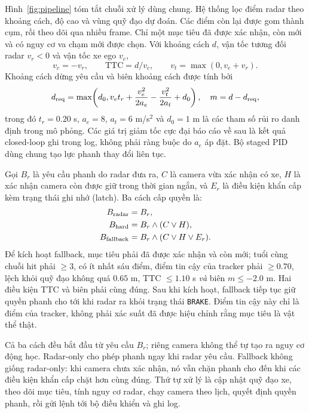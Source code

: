 \documentclass[conference]{IEEEtran}
\begin{document}
Hình~\ref{fig:pipeline} tóm tắt chuỗi xử lý dùng chung. Hệ thống lọc điểm radar theo khoảng cách, độ cao và vùng quỹ đạo dự đoán.
Các điểm còn lại được gom thành cụm, rồi theo dõi qua nhiều frame. Chỉ một
mục tiêu đã được xác nhận, còn mới và có nguy cơ va chạm mới được chọn. Với
khoảng cách $d$, vận tốc tương đối radar $v_r<0$ và vận tốc xe ego $v_e$,
\begin{equation}
v_c=-v_r,\qquad \mathrm{TTC}=d/v_c,\qquad v_t=\max(0,v_e+v_r).
\end{equation}
Khoảng cách dừng yêu cầu và biên khoảng cách được tính bởi
\begin{equation}
d_{\rm req}=\max\!\left(d_0,v_et_r+\frac{v_e^2}{2a_e}-\frac{v_t^2}{2a_t}+d_0\right),
\quad m=d-d_{\rm req},
\end{equation}
trong đó $t_r=0.20$ s, $a_e=8$, $a_t=6$ m/s$^2$ và $d_0=1$ m là các tham số
rủi ro danh định trong mô phỏng. Các giá trị giảm tốc cực đại báo cáo về sau là
kết quả closed-loop ghi trong log, không phải ràng buộc do $a_e$ áp đặt. Bộ
staged PID dùng chung tạo lực phanh thay đổi liên tục.

Gọi $B_r$ là yêu cầu phanh do radar đưa ra, $C$ là camera vừa xác nhận có xe,
$H$ là xác nhận camera còn được giữ trong thời gian ngắn, và $E_r$ là điều
kiện khẩn cấp kèm trạng thái ghi nhớ (latch). Ba cách cấp quyền là:
\begin{align}
 B_{\rm radar}&=B_r,\\
 B_{\rm hard}&=B_r\land(C\lor H),\\
 B_{\rm fallback}&=B_r\land(C\lor H\lor E_r).
\end{align}
Để kích hoạt fallback, mục tiêu phải đã được xác nhận và còn mới; tuổi cùng
chuỗi hit phải $\geq3$, có ít nhất sáu điểm, điểm tin cậy của tracker phải
$\geq0.70$, lệch khỏi quỹ đạo không quá $0.65$ m, TTC $\leq1.10$ s
\emph{và} biên $m\leq-2.0$ m. Hai điều kiện TTC và biên phải cùng đúng.
Sau khi kích hoạt, fallback tiếp tục giữ quyền phanh cho tới khi radar ra khỏi
trạng thái \texttt{BRAKE}. Điểm tin cậy này chỉ là điểm của tracker, không phải
xác suất đã được hiệu chỉnh rằng mục tiêu là vật thể thật.

Cả ba cách đều bắt đầu từ yêu cầu $B_r$; riêng camera không thể tự tạo ra
nguy cơ động học. Radar-only cho phép phanh ngay khi radar yêu cầu. Fallback
không giống radar-only: khi camera chưa xác nhận, nó vẫn chặn phanh cho đến
khi các điều kiện khẩn cấp chặt hơn cùng đúng. Thứ tự xử lý là cập nhật quỹ
đạo xe, theo dõi mục tiêu, tính nguy cơ radar, chạy camera theo lịch, quyết
định quyền phanh, rồi gửi lệnh tới bộ điều khiển và ghi log.
\end{document}

